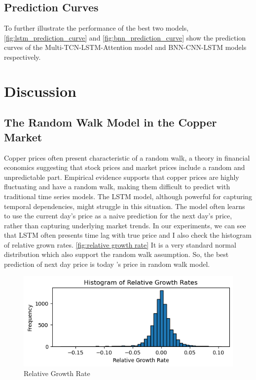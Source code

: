\documentclass[final-report]{report-template}
\begin{document}
\subsection{Prediction Curves}
To further illustrate the performance of the best two models, \autoref{fig:lstm_prediction_curve} and \autoref{fig:bnn_prediction_curve} show the prediction curves of the Multi-TCN-LSTM-Attention model and BNN-CNN-LSTM models respectively.

\section{Discussion}

\subsection{The Random Walk Model in the Copper Market}
Copper prices often present characteristic of a random walk, a theory in financial economics suggesting that stock prices and market prices include a random and unpredictable part. Empirical evidence supports that copper prices are highly fluctuating and have a random walk, making them difficult to predict with traditional time series models. The LSTM model, although powerful for capturing temporal dependencies, might struggle in this situation. The model often learns to use the current day's price as a naive prediction for the next day's price, rather than capturing underlying market trends. In our experiments, we can see that LSTM often presents time lag with true price and I also check the histogram of relative grown rates. \autoref{fig:relative growth rate} It is a very standard normal distribution which also support the random walk assumption. So, the best prediction of next day price is today 's price in random walk model.
\begin{figure}[h]
    \centering
    \includegraphics[width=1\linewidth]{figures/relative_incrrease.png}
    \caption{Relative Growth Rate}
    \label{fig:relative growth rate}
\end{figure}
\end{document}
